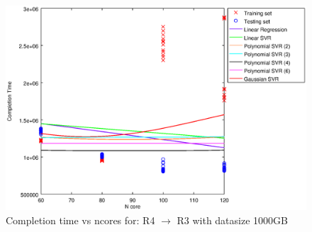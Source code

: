 
\begin {figure}[hbtp]
\centering
\includegraphics[width=\textwidth]{output/R4_R3_1000_ALL_FEATURES/plot_R4_R3_1000.eps}
\caption{Completion time vs ncores for: R4 $\rightarrow$ R3 with datasize 1000GB}
\label{fig:coreonly_linear_R4_R3_1000}
\end {figure}
